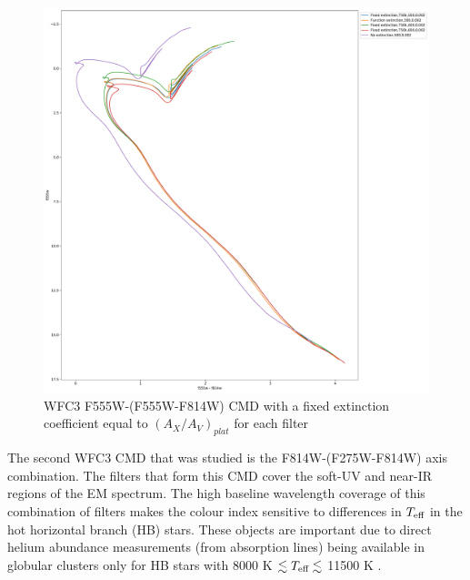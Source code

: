 \documentclass[12pt, a4paper]{report}
\begin{document}
\begin{figure}[h]
\begin{center}
\includegraphics[width=1.0\textwidth]{../basti_isochrones_10_13Gyr/Extinction_T50k_FeH0fix_func_f555w_f555wmf814w_500_400_600_Myr_FeH_0p002_ref_noext_Av_1p0.pdf}
\caption{WFC3 F555W-(F555W-F814W) CMD with a fixed extinction coefficient equal to $(A_{X}/A_{V})_{plat}$ for each filter}
\label{wfc3_isoc1_T50k}
\end{center}
\end{figure}

The second WFC3 CMD that was studied is the F814W-(F275W-F814W) axis combination. The filters that form this CMD cover the soft-UV and near-IR regions of the EM spectrum. The high baseline wavelength coverage of this combination of filters makes the colour index sensitive to differences in $T_{\textnormal{eff}}$ in the hot horizontal branch (HB) stars. These objects are important due to direct helium abundance measurements (from absorption lines) being available in globular clusters only for HB stars with 8000 K $\lesssim T_{\textnormal{eff}} \lesssim$ 11500 K \citep{2018MNRAS.475.4088L}.
\end{document}
